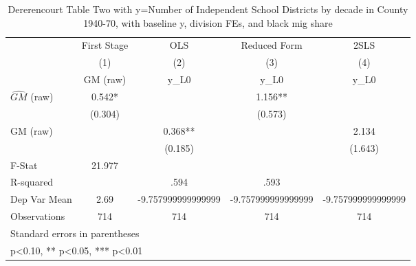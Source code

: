 \begin{table}[htbp]\centering
\def\sym#1{\ifmmode^{#1}\else\(^{#1}\)\fi}
\caption{Dererencourt Table Two with y=Number of Independent School Districts by decade in County 1940-70, with baseline y, division FEs, and black mig share}
\begin{tabular}{l*{4}{c}}
\toprule
                    & First Stage   &         OLS   &Reduced Form   &        2SLS   \\
                    &\multicolumn{1}{c}{(1)}&\multicolumn{1}{c}{(2)}&\multicolumn{1}{c}{(3)}&\multicolumn{1}{c}{(4)}\\
                    &\multicolumn{1}{c}{GM  (raw)}&\multicolumn{1}{c}{y\_L0}&\multicolumn{1}{c}{y\_L0}&\multicolumn{1}{c}{y\_L0}\\
\midrule
$\hat{GM}$ (raw)    &       0.542*  &               &       1.156** &               \\
                    &     (0.304)   &               &     (0.573)   &               \\
\addlinespace
GM  (raw)           &               &       0.368** &               &       2.134   \\
                    &               &     (0.185)   &               &     (1.643)   \\
\midrule
F-Stat              &      21.977   &               &               &               \\
R-squared           &               &        .594   &        .593   &               \\
Dep Var Mean        &        2.69   &-9.757999999999999   &-9.757999999999999   &-9.757999999999999   \\
Observations        &         714   &         714   &         714   &         714   \\
\bottomrule
\multicolumn{5}{l}{\footnotesize Standard errors in parentheses}\\
\multicolumn{5}{l}{\footnotesize * p<0.10, ** p<0.05, *** p<0.01}\\
\end{tabular}
\end{table}
